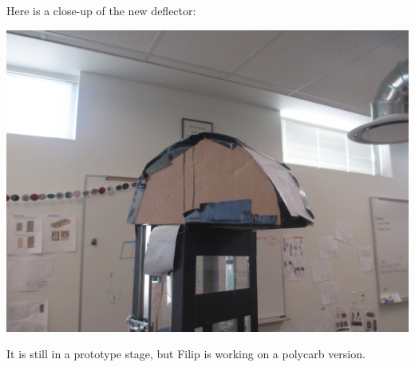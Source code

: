 Here is a close-up of the new deflector:

\begin{center}
 \includegraphics[width=\textwidth]{./Entries/Images/newDeflectorPrototype.JPG}
\end{center}

It is still in a prototype stage, but Filip is working on a polycarb version.